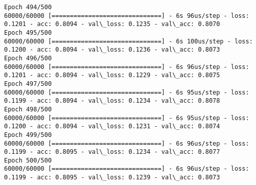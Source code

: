 \documentclass[11pt]{article}
\begin{document}
\begin{Verbatim}[commandchars=\\\{\}]
Epoch 494/500
60000/60000 [==============================] - 6s 96us/step - loss: 0.1201 - acc: 0.8094 - val\_loss: 0.1235 - val\_acc: 0.8070
Epoch 495/500
60000/60000 [==============================] - 6s 100us/step - loss: 0.1200 - acc: 0.8094 - val\_loss: 0.1236 - val\_acc: 0.8073
Epoch 496/500
60000/60000 [==============================] - 6s 96us/step - loss: 0.1201 - acc: 0.8094 - val\_loss: 0.1229 - val\_acc: 0.8075
Epoch 497/500
60000/60000 [==============================] - 6s 95us/step - loss: 0.1199 - acc: 0.8094 - val\_loss: 0.1234 - val\_acc: 0.8078
Epoch 498/500
60000/60000 [==============================] - 6s 95us/step - loss: 0.1200 - acc: 0.8094 - val\_loss: 0.1231 - val\_acc: 0.8074
Epoch 499/500
60000/60000 [==============================] - 6s 96us/step - loss: 0.1199 - acc: 0.8095 - val\_loss: 0.1234 - val\_acc: 0.8077
Epoch 500/500
60000/60000 [==============================] - 6s 96us/step - loss: 0.1199 - acc: 0.8095 - val\_loss: 0.1239 - val\_acc: 0.8073

    \end{Verbatim}
\end{document}
